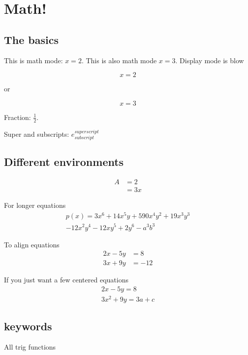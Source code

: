 \documentclass[12pt]{report}
\begin{document}
\chapter{Math!}

\section{The basics}
This is math mode: $x = 2$. This is also math mode \(x = 3\). Display mode is blow 

$$ x = 2$$

or 

\[ x = 3\]

Fraction: $\frac{1}{2}$. 

Super and subscripts: $e_{subscript}^{superscript}$ 


\section{Different environments}
\begin{equation} \label{eq1} %
    \begin{split}
    A & = 2 \\
    & = 3x
    \end{split}
\end{equation}

For longer equations 
\begin{multline*} %
p(x) = 3x^6 + 14x^5y + 590x^4y^2 + 19x^3y^3\\ 
- 12x^2y^4 - 12xy^5 + 2y^6 - a^3b^3
\end{multline*}

To align equations 
\begin{align*} 
2x - 5y &=  8 \\ 
3x + 9y &=  -12
\end{align*} 

If you just want a few centered equations 
\begin{gather*} 
2x - 5y =  8 \\ 
3x^2 + 9y =  3a + c
\end{gather*}

\section{keywords}
All trig functions 
\end{document}
